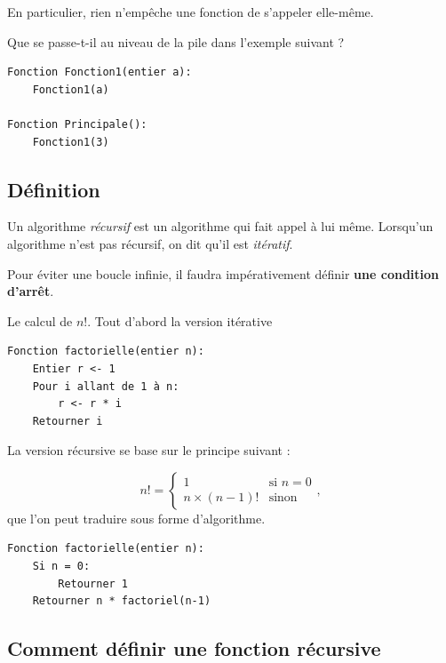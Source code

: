 \documentclass{../cours}
\begin{document}
En particulier, rien n'empêche une fonction de s'appeler elle-même.

\begin{Example}
Que se passe-t-il au niveau de la pile dans l'exemple suivant ?

\begin{lstlisting}
Fonction Fonction1(entier a):
    Fonction1(a)
    
Fonction Principale():
    Fonction1(3)
\end{lstlisting}
\end{Example}

\subsection{Définition}

\begin{Definition}
Un algorithme \emph{récursif} est un algorithme qui fait appel à lui même. Lorsqu'un algorithme n'est pas récursif, on dit qu'il est \emph{itératif}.
\end{Definition}

Pour éviter une boucle infinie, il faudra impérativement définir \textbf{une condition d'arrêt}.

\begin{Example}
Le calcul de $n!$. Tout d'abord la version itérative

\begin{lstlisting}
Fonction factorielle(entier n):
    Entier r <- 1
    Pour i allant de 1 à n:
        r <- r * i
    Retourner i
\end{lstlisting}

La version récursive se base sur le principe suivant :

\begin{equation}
n! = \begin{cases}
1 & \text{si } n = 0 \\
n \times (n-1)! & \text{sinon}
\end{cases},
\end{equation}
que l'on peut traduire sous forme d'algorithme.

\begin{lstlisting}
Fonction factorielle(entier n):
    Si n = 0:
        Retourner 1
    Retourner n * factoriel(n-1)
\end{lstlisting}
\end{Example}

\subsection{Comment définir une fonction récursive}
\end{document}
